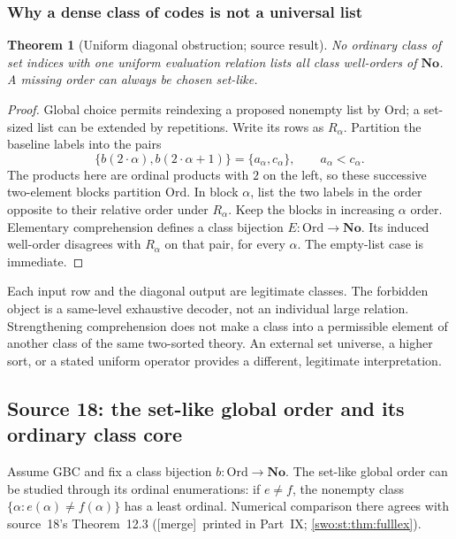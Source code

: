 \documentclass[11pt]{article}
\newtheorem{theorem}{Theorem}[section]
\theoremstyle{definition}
\theoremstyle{remark}
\newcommand{\No}{\mathbf{No}}
\newcommand{\Ord}{\mathrm{Ord}}
\newcommand{\merge}{\textsf{[merge]}}
\begin{document}
\subsubsection{Why a dense class of codes is not a universal list}
\begin{theorem}[Uniform diagonal obstruction; source result]
\label{swo:gs:thm:diagonal}
No ordinary class of set indices with one uniform evaluation relation
lists all class well-orders of $\No$. A missing order can always be
chosen set-like.
\end{theorem}
\begin{proof}
Global choice permits reindexing a proposed nonempty list by $\Ord$;
a set-sized list can be extended by repetitions. Write its rows as
$R_\alpha$. Partition the baseline labels into the pairs
\[
 \{b(2\cdot\alpha),b(2\cdot\alpha+1)\}=\{a_\alpha,c_\alpha\},
 \qquad a_\alpha<c_\alpha.
\]
The products here are ordinal products with $2$ on the left, so these
successive two-element blocks partition $\Ord$. In block $\alpha$, list
the two labels in the order opposite to their relative order under
$R_\alpha$. Keep the blocks in increasing $\alpha$ order. Elementary
comprehension defines a class bijection $E:\Ord\to\No$. Its induced
well-order disagrees with $R_\alpha$ on that pair, for every $\alpha$.
The empty-list case is immediate.
\end{proof}

Each input row and the diagonal output are legitimate classes. The
forbidden object is a same-level exhaustive decoder, not an individual
large relation. Strengthening comprehension does not make a class into
a permissible element of another class of the same two-sorted theory.
An external set universe, a higher sort, or a stated uniform operator
provides a different, legitimate interpretation.

\subsection{Source 18: the set-like global order and its ordinary class core}
\label{swo:sh:sec:global-core}

Assume GBC and fix a class bijection $b:\Ord\to\No$.
The set-like global order can be studied through its ordinal
enumerations: if $e\ne f$, the nonempty class
$\{\alpha:e(\alpha)\ne f(\alpha)\}$ has a least ordinal. Numerical
comparison there agrees with source~18's Theorem~12.3 (\merge\ printed in
Part~IX; \cref{swo:st:thm:fulllex}).
\end{document}
